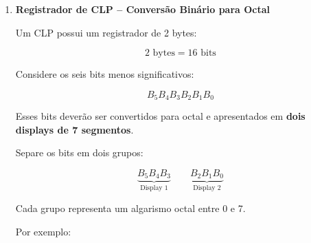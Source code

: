 \documentclass[a4paper,12pt]{article}
\begin{document}
\begin{enumerate}[leftmargin=*]
Desenvolva uma chave eletrônica cuja senha seja formada por:

\begin{itemize}
    \item 4 bits em BCD: $B_3B_2B_1B_0$;
    \item 3 bits em Código Gray: $G_2G_1G_0$;
    \item um botão $E$ (ENTRAR).
\end{itemize}

A saída $ABRIR$ deverá ser ativada somente quando a combinação BCD,
a combinação Gray e o botão ENTRAR estiverem corretos.

\[
\text{BCD correto}
+
\text{Gray correto}
+
E
\longrightarrow
ABRIR
\]

\textbf{Requisitos:}

\begin{itemize}
    \item Defina uma senha válida;
    \item Utilize chaves digitais para inserir a senha;
    \item Utilize um botão para ENTRAR;
    \item Utilize um LED para representar $ABRIR$;
    \item Teste combinações corretas e incorretas.
\end{itemize}

\vspace{0.4cm}


\item \textbf{Registrador de CLP -- Conversão Binário para Octal}

Um CLP possui um registrador de 2 bytes:

\[
2\text{ bytes}=16\text{ bits}
\]

Considere os seis bits menos significativos:

\[
B_5B_4B_3B_2B_1B_0
\]

Esses bits deverão ser convertidos para octal e apresentados em
\textbf{dois displays de 7 segmentos}.

Separe os bits em dois grupos:

\[
\underbrace{B_5B_4B_3}_{\text{Display 1}}
\qquad
\underbrace{B_2B_1B_0}_{\text{Display 2}}
\]

Cada grupo representa um algarismo octal entre 0 e 7.

Por exemplo:


\end{enumerate}
\end{document}
